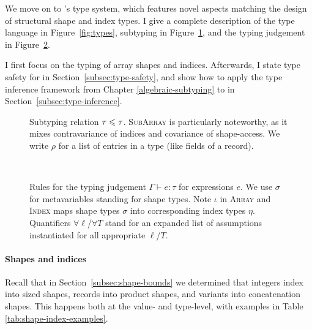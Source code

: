 We move on to \starr{}'s type system, which features novel aspects matching the design of structural shape and index types. 
I give a complete description of the type language in Figure~\ref{fig:types}, subtyping in Figure~\ref{fig:subtyping}, and the typing judgement in Figure~\ref{fig:typing}. 

I first focus on the typing of array shapes and indices.
Afterwards, I state type safety for \starr{} in Section~\ref{subsec:type-safety}, and show how to apply the type inference framework from Chapter \ref{algebraic-subtyping} to \starr{} in Section~\ref{subsec:type-inference}.


\begin{figure}[p]
    \centering
    
    \caption{
        Subtyping relation $\tau \leqslant \tau$. \textsc{SubArray} is particularly noteworthy, as it mixes contravariance of indices and covariance of shape-access. 
        We write $\rho$ for a list of entries in a type (like fields of a record). 
    }
    \label{fig:subtyping}
\end{figure}
~
\begin{figure}[p]
    \centering
    
    \caption{Rules for the typing judgement $\Gamma \vdash e : \tau$ for \starr{} expressions $e$. We use $\sigma$ for metavariables standing for shape types.
    Note $\iota$ in \textsc{Array} and \textsc{Index} maps shape types $\sigma$ into corresponding index types $\eta$. 
    Quantifiers $\forall \ell$/$\forall T$ stand for an expanded list of assumptions instantiated for all appropriate $\ell$/$T$.
    }
    \label{fig:typing}
\end{figure}

\paragraph{Shapes and indices}

Recall that in Section~\ref{subsec:shape-bounds} we determined that integers index into sized shapes, records into product shapes, and variants into concatenation shapes. This happens both at the value- and type-level, with examples in Table \ref{tab:shape-index-examples}.

